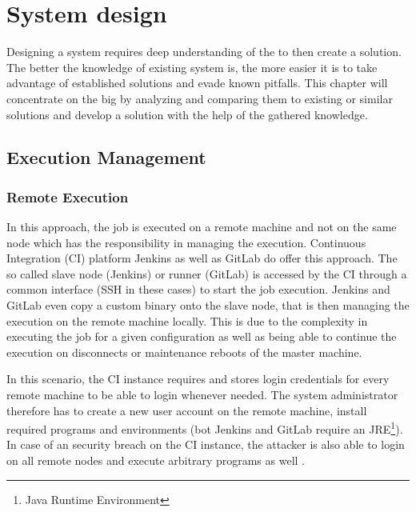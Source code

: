 \chapter{System design}


Designing a system requires deep understanding of the  to then create a solution.
The better the knowledge of existing system is, the more easier it is to take advantage of established solutions and evade known pitfalls.
This chapter will concentrate on the big  by analyzing and comparing them to existing or similar solutions and develop a solution with the help of the gathered knowledge.

\section{Execution Management}

\subsection{Remote Execution}

In this approach, the job is executed on a remote machine and not on the same node which has the responsibility in managing the execution.
Continuous Integration (CI) platform Jenkins\cite{jenkins:main} as well as GitLab\cite{gitlab:main} do offer this approach.
The so called slave node (Jenkins) or runner (GitLab) is accessed by the CI through a common interface (SSH in these cases) to start the job execution.
Jenkins and GitLab even copy a custom binary onto the slave node, that is then managing the execution on the remote machine locally.
This is due to the complexity in executing the job for a given configuration as well as being able to continue the execution on disconnects or maintenance reboots of the master machine.

In this scenario, the CI instance requires and stores login credentials for every remote machine to be able to login whenever needed.
The system administrator therefore has to create a new user account on the remote machine, install required programs and environments (bot Jenkins and GitLab require an JRE\footnote{Java Runtime Environment}).
In case of an security breach on the CI instance, the attacker is also able to login on all remote nodes and execute arbitrary programs as well .

